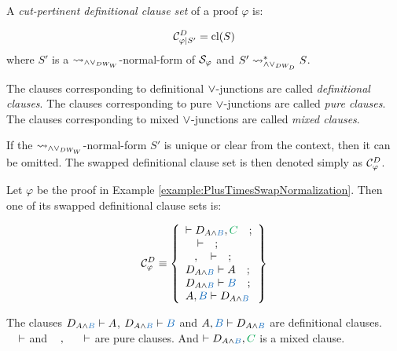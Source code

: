 \documentclass{llncs}
\begin{document}
\begin{definition}
\label{definition:CutPertinentClauseSetSwappedDefinitional}
A \emph{cut-pertinent definitional clause set} of a proof $\varphi$ is:

$$
\mathcal{C}^{D}_{\varphi|S'} = \textrm{cl}(S)
$$
where $S'$ is a $\leadsto_{\wedge\vee_{DW_W}}$-normal-form of $\mathcal{S}_{\varphi}$ and $S' \leadsto_{\wedge\vee_{DW_D}}^* S$.


The clauses corresponding to definitional $\vee$-junctions are called \emph{definitional clauses}. The clauses corresponding to pure $\vee$-junctions are called \emph{pure clauses}. The clauses corresponding to mixed $\vee$-junctions are called \emph{mixed clauses}.

If the $\leadsto_{\wedge\vee_{DW_W}}$-normal-form $S'$ is unique or clear from the context, then it can be omitted. The swapped definitional clause set is then denoted simply as $\mathcal{C}^{D}_{\varphi}$.
\end{definition}

\begin{example}
\label{example:SwappedDefinitionalClauseSet}


Let $\varphi$ be the proof in Example \ref{example:PlusTimesSwapNormalization}. Then one of its swapped definitional clause sets is:

$$
\clausesetSwappedDefinitionalUnique{\varphi} \equiv  \left\{ \begin{array}{l}
	\seq D_{\hA{A} \structplus \hB{B}} , \hE{C} 
\ \ \ ; \\
	\hF{C} \seq 
\ \ \ ; \\
	\hC{B} , \hD{A} \seq
\ \ \ ; \\
	D_{\hA{A} \structplus \hB{B}} \seq \hA{A}  
\ \ \ ; \\
	D_{\hA{A} \structplus \hB{B}} \seq \hB{B} 
\ \ \ ; \\
	\hA{A}, \hB{B} \seq D_{\hA{A} \structplus \hB{B}} 
\end{array} \right\}
$$

The clauses $D_{\hA{A} \structplus \hB{B}} \seq \hA{A}$, $D_{\hA{A} \structplus \hB{B}} \seq \hB{B}$ and 
$\hA{A}, \hB{B} \seq D_{\hA{A} \structplus \hB{B}}$ are definitional clauses. $\hF{C} \seq $ and 
$\hC{B} , \hD{\structdual{A}} \seq$ are pure clauses. And $\seq D_{\hA{A} \structplus \hB{B}} , \hE{C}$ is a mixed clause.
\end{example}
\end{document}

